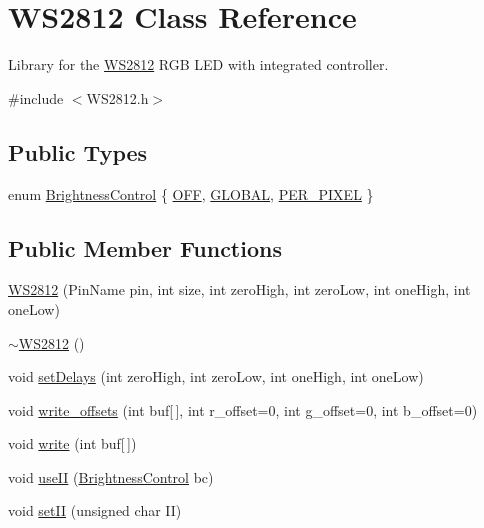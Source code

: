 \hypertarget{class_w_s2812}{}\section{W\+S2812 Class Reference}
\label{class_w_s2812}


Library for the \hyperlink{class_w_s2812}{W\+S2812} R\+GB L\+ED with integrated controller.  




{\ttfamily \#include $<$W\+S2812.\+h$>$}

\subsection*{Public Types}
\begin{DoxyCompactItemize}
\item 
enum \hyperlink{class_w_s2812_a14186f70863bf4f3a35b2cc21b15642d}{Brightness\+Control} \{ \hyperlink{class_w_s2812_a14186f70863bf4f3a35b2cc21b15642da3937d959838b5887619b403a2f717d55}{O\+FF}, 
\hyperlink{class_w_s2812_a14186f70863bf4f3a35b2cc21b15642daa7deeb0d0cec915ba197b48ca887ed45}{G\+L\+O\+B\+AL}, 
\hyperlink{class_w_s2812_a14186f70863bf4f3a35b2cc21b15642dad5ae572eb876f9e90650fd6817385863}{P\+E\+R\+\_\+\+P\+I\+X\+EL}
 \}
\end{DoxyCompactItemize}
\subsection*{Public Member Functions}
\begin{DoxyCompactItemize}
\item 
\hyperlink{class_w_s2812_a397fb1e75594024884cb4365d3c725cd}{W\+S2812} (Pin\+Name pin, int size, int zero\+High, int zero\+Low, int one\+High, int one\+Low)
\item 
\hyperlink{class_w_s2812_a58973dedd9cbc5c3fd3397f07f9a720f}{$\sim$\+W\+S2812} ()
\item 
void \hyperlink{class_w_s2812_a7e1370e6fbb56daa68f1146e7b58d9ec}{set\+Delays} (int zero\+High, int zero\+Low, int one\+High, int one\+Low)
\item 
void \hyperlink{class_w_s2812_a578fd0b278445bd6f84e260a69b18a68}{write\+\_\+offsets} (int buf\mbox{[}$\,$\mbox{]}, int r\+\_\+offset=0, int g\+\_\+offset=0, int b\+\_\+offset=0)
\item 
void \hyperlink{class_w_s2812_ab85d6a78bc51929dac48db05f6bc68d4}{write} (int buf\mbox{[}$\,$\mbox{]})
\item 
void \hyperlink{class_w_s2812_acb221ea7ba9cfb40a43b7778f0dffa5d}{use\+II} (\hyperlink{class_w_s2812_a14186f70863bf4f3a35b2cc21b15642d}{Brightness\+Control} bc)
\item 
void \hyperlink{class_w_s2812_a8b6491617f9beb271d6d5c56ba384fb6}{set\+II} (unsigned char II)
\end{DoxyCompactItemize}



